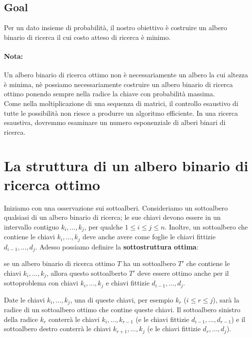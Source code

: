 \subsection{Goal}

Per un dato insieme di probabilità, il nostro obiettivo è costruire un
albero binario di ricerca il cui costo atteso di ricerca è minimo.

\paragraph*{Nota:} Un albero binario di ricerca ottimo non è necessariamente
un albero la cui altezza è minima, nè possiamo necessariamente costruire
un albero binario di ricerca ottimo ponendo sempre nella radice la
chiave con probabilità massima.\\

Come nella moltiplicazione di una sequenza di matrici, il controllo
esaustivo di tutte le possibilità non riesce a produrre un algoritmo
efficiente. In una ricerca esaustiva, dovremmo esaminare un numero
esponenziale di alberi binari di ricerca.


\section{La struttura di un albero binario di ricerca ottimo}

Iniziamo con una osservazione sui sottoalberi. Consideriamo un
sottoalbero qualsiasi di un albero binario di ricerca; le sue chiavi
devono essere in un intervallo contiguo $k_i, ..., k_j$, per qualche
$1 \le i \le j \le n$. Inoltre, un sottoalbero che contiene le chiavi
$k_i, ..., k_j$ deve anche avere come foglie le chiavi fittizie
$d_{i-1}, ..., d_j$. Adesso possiamo definire la
\textbf{sottostruttura ottima}:
\begin{myblockquote}
  se un albero
  binario di ricerca ottimo $T$ ha un sottoalbero $T'$ che contiene le
  chiavi $k_i, ..., k_j$, allora questo sottoalberto $T'$ deve essere
  ottimo anche per il sottoproblema con chiavi $k_i, ..., k_j$ e chiavi
  fittizie $d_{i-1}, ..., d_j$.
\end{myblockquote}
Date le chiavi $k_i, ..., k_j$, una di queste chiavi, per esempio
$k_r$ ($i \le r \le j$), sarà la radice di un sottoalbero ottimo che
contine queste chiavi. Il sottoalbero sinistro della radice $k_r$
conterrà le chiavi $k_i, ..., k_{r-1}$ (e le chiavi fittizie
$d_{i-1}, ..., d_{r-1}$) e il sottoalbero destro conterrà le chiavi
$k_{r+1}, ..., k_j$ (e le chiavi fittizie $d_{r}, ..., d_{j}$).\\


